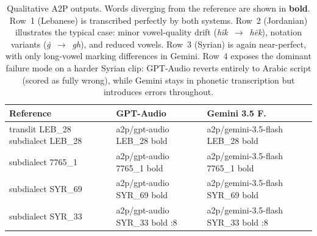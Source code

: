 \begin{table}[t]
\centering
\small
\begin{tabular}{p{} p{} p{}}
\toprule
\textbf{Reference} & \textbf{GPT-Audio} & \textbf{Gemini 3.5 F.} \\
\midrule
{{translit LEB_28}}
  \newline \scriptsize {{subdialect LEB_28}}
& {{a2p/gpt-audio LEB_28 bold}}
& {{a2p/gemini-3.5-flash LEB_28 bold}} \\
\addlinespace[6pt]
{{translit 7765_1}}
  \newline \scriptsize {{subdialect 7765_1}}
& {{a2p/gpt-audio 7765_1 bold}}
& {{a2p/gemini-3.5-flash 7765_1 bold}} \\
\addlinespace[6pt]
{{translit SYR_69}}
  \newline \scriptsize {{subdialect SYR_69}}
& {{a2p/gpt-audio SYR_69 bold}}
& {{a2p/gemini-3.5-flash SYR_69 bold}} \\
\addlinespace[6pt]
{{translit SYR_33 :8}}
  \newline \scriptsize {{subdialect SYR_33}}
& {{a2p/gpt-audio SYR_33 bold :8}}
& {{a2p/gemini-3.5-flash SYR_33 bold :8}} \\
\bottomrule
\end{tabular}
\caption{Qualitative A2P outputs. Words diverging from the reference are shown in \textbf{bold}. Row~1 (Lebanese) is transcribed perfectly by both systems. Row~2 (Jordanian) illustrates the typical case: minor vowel-quality drift (\textit{hīk}~$\to$~\textit{hēk}), notation variants (\textit{ġ}~$\to$~\textit{gh}), and reduced vowels. Row~3 (Syrian) is again near-perfect, with only long-vowel marking differences in Gemini. Row~4 exposes the dominant failure mode on a harder Syrian clip: GPT-Audio reverts entirely to Arabic script (scored as fully wrong), while Gemini stays in phonetic transcription but introduces errors throughout.}
\label{tab:a2p-qualitative}
\end{table}
